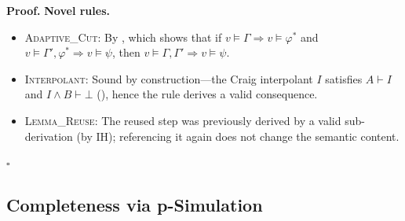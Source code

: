 \documentclass[conference]{IEEEtran}
\newenvironment{proof}[1][Proof]{\textbf{#1.} }{\hfill$\square$}
\newcommand{\entails}{\vDash}
\newcommand{\proves}{\vdash}
\newcommand{\dlbot}{\bot}
\begin{document}
\begin{proof}
  \noindent\textbf{Novel rules.}
  \begin{itemize}
    \item \textsc{Adaptive\_Cut}: By
      , which shows that if
      $v \entails \Gamma \Rightarrow v \entails \varphi^*$ and
      $v \entails \Gamma', \varphi^* \Rightarrow v \entails \psi$,
      then $v \entails \Gamma, \Gamma' \Rightarrow v \entails \psi$.
    \item \textsc{Interpolant}: Sound by construction---the Craig
      interpolant $I$ satisfies $A \proves I$ and $I \wedge B \proves \dlbot$
      (), hence the rule derives a valid
      consequence.
    \item \textsc{Lemma\_Reuse}: The reused step was previously derived
      by a valid sub-derivation (by IH); referencing it again does not
      change the semantic content.
  \end{itemize}
\end{proof}

\subsection{Completeness via p-Simulation}
\end{document}
